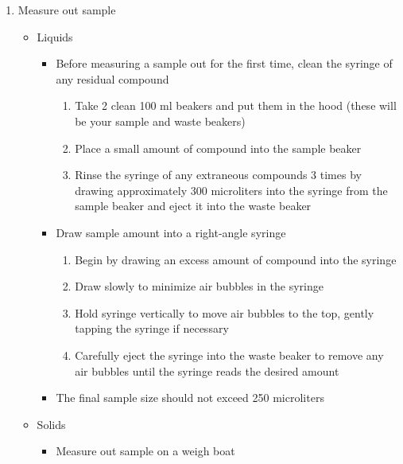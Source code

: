 \begin{enumerate}
\def\labelenumi{\arabic{enumi}.}
\item
  Measure out sample

  \begin{itemize}
  \item
    Liquids

    \begin{itemize}
    \tightlist
    \item
      Before measuring a sample out for the first time, clean the
      syringe of any residual compound

      \begin{enumerate}
      \def\labelenumii{\arabic{enumii}.}
      \tightlist
      \item
        Take 2 clean 100 ml beakers and put them in the hood (these will
        be your sample and waste beakers)
      \item
        Place a small amount of compound into the sample beaker
      \item
        Rinse the syringe of any extraneous compounds 3 times by drawing
        approximately 300 microliters into the syringe from the sample
        beaker and eject it into the waste beaker
      \end{enumerate}
    \item
      Draw sample amount into a right-angle syringe

      \begin{enumerate}
      \def\labelenumii{\arabic{enumii}.}
      \tightlist
      \item
        Begin by drawing an excess amount of compound into the syringe
      \item
        Draw slowly to minimize air bubbles in the syringe
      \item
        Hold syringe vertically to move air bubbles to the top, gently
        tapping the syringe if necessary
      \item
        Carefully eject the syringe into the waste beaker to remove any
        air bubbles until the syringe reads the desired amount
      \end{enumerate}
    \item
      The final sample size should not exceed 250 microliters
    \end{itemize}
  \item
    Solids

    \begin{itemize}
    \tightlist
    \item
      Measure out sample on a weigh boat


\end{itemize}
\end{itemize}
\end{enumerate}
